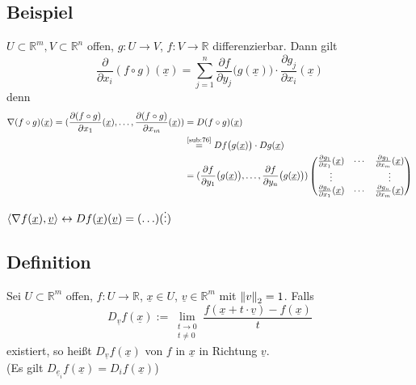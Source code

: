 \subsection{Beispiel} %
\label{sub:77}
$U \subset \mathds{R}^m, V \subset \mathds{R}^n$ offen, $g : U \to V$, $f: V \to \mathds{R}$ differenzierbar. Dann gilt 
\[
	\frac{\partial}{\partial x_i} (f \circ g) (\underline{x} ) = \sum_{j=1}^{n} \frac{\partial f}{\partial y_j} \big( g(\underline{x}) \big) \cdot  \frac{\partial g_j}{\partial x_i}
	(\underline{x} )  
\]
denn 
\begin{align*}
	\nabla (f \circ g)(\underline{x} ) = ( \frac{{\partial (f \circ g)}}{{\partial x_1}}  (\underline{x} ), \ldots , \frac{{\partial (f \circ g)}}{{\partial x_m}}  (\underline{x} )) &= D (f \circ g) (\underline{x} ) \\
	&\stackrel{\text{\ref{sub:76}}}{=} D f \big(g(\underline{x} )\big) \cdot D g (\underline{x} ) \\
	&= ( \frac{{\partial f}}{{\partial y_1}} \big( g(\underline{x} )\big), \ldots , \frac{{\partial f}}{{\partial y_n}}  \big(g(\underline{x} )\big)  ) \begin{pmatrix}
		\frac{{\partial g_1}}{{\partial x_1}} (\underline{x} ) & \cdots & \frac{{\partial g_1}}{{\partial x_m}}  (\underline{x} ) \\
		\vdots & & \vdots \\
		\frac{{\partial g_n}}{{\partial x_1}}  (\underline{x} ) & \cdots & \frac{{\partial g_n}}{{\partial x_m}}  (\underline{x} )
	\end{pmatrix}  
\end{align*}
$\langle \nabla f(\underline{x}), \underline{v}\rangle \leftrightarrow D f(\underline{x}) (\underline{v}) = (\ldots ) (\vdots) $

\subsection[Definition: Richtungsableitung]{Definition} %
\label{sub:78}
Sei $U \subset \mathds{R}^m$ offen, $f : U \to \mathds{R}$, $\underline{x} \in U $, $\underline{v} \in \mathds{R}^m $ mit $\norm[2]{v}=1$. Falls 
\[
	D_{\underline{v} } f(\underline{x}) := \lim_{ \substack{t \to 0 \\ t \not= 0}} \frac{ f( \underline{x} + t \cdot \underline{v}) - f(\underline{x}) }{t}  
\]
existiert, so heißt $D_{\underline{v}} f(\underline{x})$  von $f$ in $\underline{x}$ in Richtung $\underline{v}$. \\
(Es gilt $D_{\underline{e}_i } f(\underline{x}) = D_i f(\underline{x})$)


